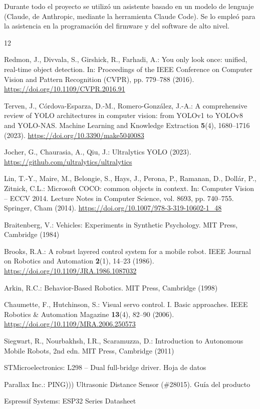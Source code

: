 \documentclass[pdflatex,sn-mathphys-num]{sn-jnl}
\begin{document}
Durante todo el proyecto se utiliz\'o un asistente basado en un modelo de
lenguaje (Claude, de Anthropic, mediante la herramienta Claude Code). Se lo
emple\'o para la asistencia en la programaci\'on del firmware y del software
de alto nivel.
\begin{thebibliography}{12}

Redmon, J., Divvala, S., Girshick, R., Farhadi, A.: You only look once:
unified, real-time object detection. In: Proceedings of the IEEE Conference on
Computer Vision and Pattern Recognition (CVPR), pp. 779--788 (2016).
\url{https://doi.org/10.1109/CVPR.2016.91}

Terven, J., C\'ordova-Esparza, D.-M., Romero-Gonz\'alez, J.-A.: A comprehensive
review of YOLO architectures in computer vision: from YOLOv1 to YOLOv8 and
YOLO-NAS. Machine Learning and Knowledge Extraction \textbf{5}(4), 1680--1716
(2023). \url{https://doi.org/10.3390/make5040083}

Jocher, G., Chaurasia, A., Qiu, J.: Ultralytics YOLO (2023).
\url{https://github.com/ultralytics/ultralytics}

Lin, T.-Y., Maire, M., Belongie, S., Hays, J., Perona, P., Ramanan, D.,
Doll\'ar, P., Zitnick, C.L.: Microsoft COCO: common objects in context. In:
Computer Vision -- ECCV 2014. Lecture Notes in Computer Science, vol. 8693,
pp. 740--755. Springer, Cham (2014).
\url{https://doi.org/10.1007/978-3-319-10602-1_48}

Braitenberg, V.: Vehicles: Experiments in Synthetic Psychology. MIT Press,
Cambridge (1984)

Brooks, R.A.: A robust layered control system for a mobile robot. IEEE Journal
on Robotics and Automation \textbf{2}(1), 14--23 (1986).
\url{https://doi.org/10.1109/JRA.1986.1087032}

Arkin, R.C.: Behavior-Based Robotics. MIT Press, Cambridge (1998)

Chaumette, F., Hutchinson, S.: Visual servo control. I. Basic approaches. IEEE
Robotics \& Automation Magazine \textbf{13}(4), 82--90 (2006).
\url{https://doi.org/10.1109/MRA.2006.250573}

Siegwart, R., Nourbakhsh, I.R., Scaramuzza, D.: Introduction to Autonomous
Mobile Robots, 2nd edn. MIT Press, Cambridge (2011)

STMicroelectronics: L298 -- Dual full-bridge driver. Hoja de datos

Parallax Inc.: PING))) Ultrasonic Distance Sensor (\#28015). Gu\'ia del
producto

Espressif Systems: ESP32 Series Datasheet

\end{thebibliography}
\end{document}
